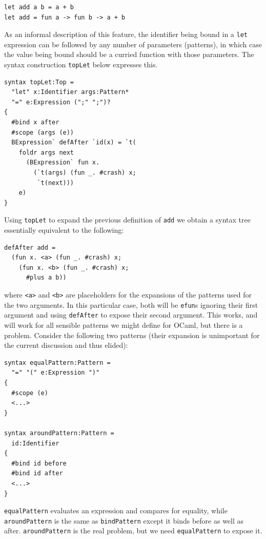 \documentclass{kththesis}
\begin{document}
\begin{verbatim}
let add a b = a + b
let add = fun a -> fun b -> a + b
\end{verbatim}

As an informal description of this feature, the identifier being bound in a \texttt{let} expression can be followed by any number of parameters (patterns), in which case the value being bound should be a curried function with those parameters. The syntax construction \texttt{topLet} below expresses this.

\begin{verbatim}
syntax topLet:Top =
  "let" x:Identifier args:Pattern*
  "=" e:Expression (";" ";")?
{
  #bind x after
  #scope (args (e))
  BExpression` defAfter `id(x) = `t(
    foldr args next
      (BExpression` fun x.
        (`t(args) (fun _. #crash) x;
         `t(next)))
    e)
}
\end{verbatim}

Using \texttt{topLet} to expand the previous definition of \texttt{add} we obtain a syntax tree essentially equivalent to the following:

\begin{verbatim}
defAfter add =
  (fun x. <a> (fun _. #crash) x;
    (fun x. <b> (fun _. #crash) x;
      #plus a b))
\end{verbatim}

where \texttt{<a>} and \texttt{<b>} are placeholders for the expansions of the patterns used for the two arguments. In this particular case, both will be \texttt{efun}s ignoring their first argument and using \texttt{defAfter} to expose their second argument. This works, and will work for all sensible patterns we might define for OCaml, but there is a problem. Consider the following two patterns (their expansion is unimportant for the current discussion and thus elided):

\begin{verbatim}
syntax equalPattern:Pattern =
  "=" "(" e:Expression ")"
{
  #scope (e)
  <...>
}

syntax aroundPattern:Pattern =
  id:Identifier
{
  #bind id before
  #bind id after
  <...>
}
\end{verbatim}

\texttt{equalPattern} evaluates an expression and compares for equality, while \texttt{aroundPattern} is the same as \texttt{bindPattern} except it binds before as well as after. \texttt{aroundPattern} is the real problem, but we need \texttt{equalPattern} to expose it.
\end{document}
